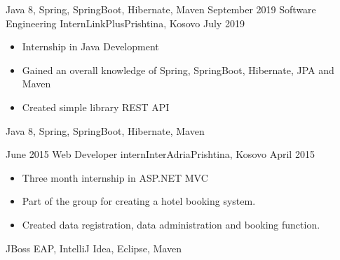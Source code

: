 \begin{experiences}
{\begin{itemize}
                      \end{itemize}
                    }
                    {Java 8, Spring, SpringBoot, Hibernate, Maven}
  \emptySeparator
  \experience
    {September 2019}   {Software Engineering Intern}{LinkPlus}{Prishtina, Kosovo}
    {July 2019} {
                      \begin{itemize}
                        \item Internship in Java Development                   
                        \item Gained an overall knowledge of Spring, SpringBoot, Hibernate, JPA and Maven              
                        \item  Created simple library REST API  
                      \end{itemize}
                    }
                    {Java 8, Spring, SpringBoot, Hibernate, Maven}
  \emptySeparator
                     
                                                                                 
  \experience
    {June 2015} { Web Developer intern}{InterAdria}{Prishtina, Kosovo}
    {April 2015}    {
                      \begin{itemize}
                        \item Three month internship in ASP.NET MVC                           
                        \item Part of the group for creating a hotel booking system.                       
                        \item Created data registration, data administration and booking function.
                                                                                 
                      \end{itemize}
                    }
                    {JBoss EAP, IntelliJ Idea, Eclipse, Maven}
 
 
\end{experiences}
 
